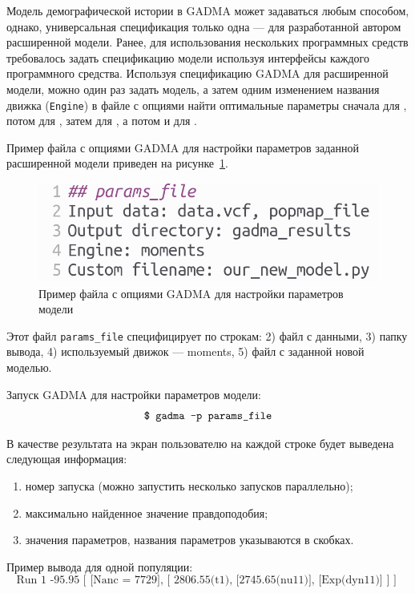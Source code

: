 \documentclass[a4paper,14pt,oneside,openany,article]{memoir}
\begin{document}
Модель демографической истории в GADMA может задаваться любым способом, однако, универсальная спецификация только одна --- для разработанной автором расширенной модели.
Ранее, для использования нескольких программных средств требовалось задать спецификацию модели используя интерфейсы каждого программного средства.
Используя спецификацию GADMA для расширенной модели, можно один раз задать модель, а затем одним изменением названия движка (\texttt{Engine}) в файле с опциями найти оптимальные параметры сначала для \dadi, потом для \moments, затем для \momentsLD, а потом и для \momi.

Пример файла с опциями GADMA для настройки параметров заданной расширенной модели приведен на рисунке~\ref{fig:gadma_params}.

\begin{figure}[h]
    \centering
    \includegraphics[width=0.5\linewidth]{images_2/gadma_file.png}
    \caption{Пример файла с опциями GADMA для настройки параметров модели}
    \label{fig:gadma_params}
\end{figure}

Этот файл \texttt{params\_file} специфицирует по строкам: 2) файл с данными, 3) папку вывода, 4) используемый движок --- moments, 5) файл с заданной новой моделью.

Запуск GADMA для настройки параметров модели:
$$\text{\texttt{\$ gadma -p params\_file}}$$

В качестве результата на экран пользователю на каждой строке будет выведена следующая информация:
\begin{enumerate}
    \item номер запуска (можно запустить несколько запусков параллельно);
    \item максимально найденное значение правдоподобия;
    \item значения параметров, названия параметров указываются в скобках.\\
\end{enumerate}

Пример вывода для одной популяции:
$$\text{Run 1   -95.95  [ [Nanc = 7729],        [ 2806.55(t1), [2745.65(nu11)], [Exp(dyn11)] ] ] }$$
\end{document}

